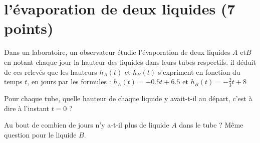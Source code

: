 \section{l'évaporation de deux liquides (7 points)}

Dans un laboratoire, un observateur étudie l'évaporation de deux liquides $A$ et$B$ en notant chaque jour la hauteur des liquides dans leurs tubes respectifs. il déduit de ces relevés que les hauteurs $h_A(t)$ et $h_B(t)$ s'expriment en fonction du temps $t$, en jours par les formules :
$h_A(t) = -\num{0.5}t + \num{6.5}$ et $h_B(t) = -\frac{2}{3}t + 8 $


\begin{questions}
	\question[1] Pour chaque tube, quelle hauteur de chaque liquide y avait-t-il au départ, c'est à dire à l'instant $t=0$ ?
	
	\question[2] Au bout de combien de jours n'y a-t-il plus de liquide $A$ dans le tube ? Même question pour le liquide $B$.
	
	\question
\end{questions}